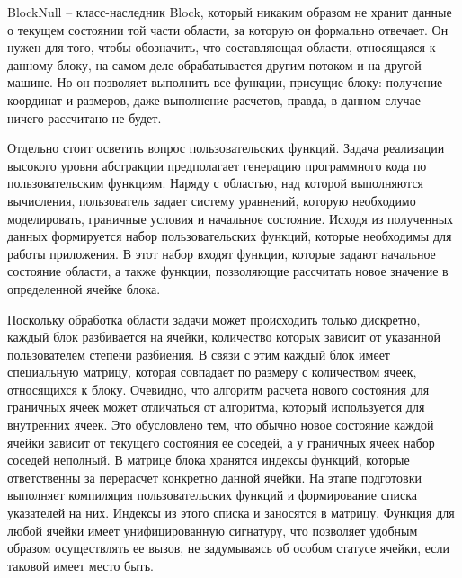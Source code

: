 \documentclass[a4paper, 14pt]{extarticle}
\theoremstyle{definition}
\begin{document}
\par BlockNull -- класс-наследник Block, который никаким образом не хранит данные о текущем состоянии той части области, за которую он формально отвечает. Он нужен для того, чтобы обозначить, что составляющая области, относящаяся к данному блоку, на самом деле обрабатывается другим потоком и на другой машине. Но он позволяет выполнить все функции, присущие блоку: получение координат и размеров, даже выполнение расчетов, правда, в данном случае ничего рассчитано не будет.

\par Отдельно стоит осветить вопрос пользовательских функций. Задача реализации высокого уровня абстракции предполагает генерацию программного кода по пользовательским функциям. Наряду с областью, над которой выполняются вычисления, пользователь задает систему уравнений, которую необходимо моделировать, граничные условия и начальное состояние. Исходя из полученных данных формируется набор пользовательских функций, которые необходимы для работы приложения. В этот набор входят функции, которые задают начальное состояние области, а также функции, позволяющие рассчитать новое значение в определенной ячейке блока.

\par Поскольку обработка области задачи может происходить только дискретно, каждый блок разбивается на ячейки, количество которых зависит от указанной пользователем степени разбиения. В связи с этим каждый блок имеет специальную матрицу, которая совпадает по размеру с количеством ячеек, относящихся к блоку. Очевидно, что алгоритм расчета нового состояния для граничных ячеек может отличаться от алгоритма, который используется для внутренних ячеек. Это обусловлено тем, что обычно новое состояние каждой ячейки зависит от текущего состояния ее соседей, а у граничных ячеек набор соседей неполный. В матрице блока хранятся индексы функций, которые ответственны за перерасчет конкретно данной ячейки. На этапе подготовки выполняет компиляция пользовательских функций и формирование списка указателей на них. Индексы из этого списка и заносятся в матрицу. Функция для любой ячейки имеет унифицированную сигнатуру, что позволяет удобным образом осуществлять ее вызов, не задумываясь об особом статусе ячейки, если таковой имеет место быть.

\end{document}
